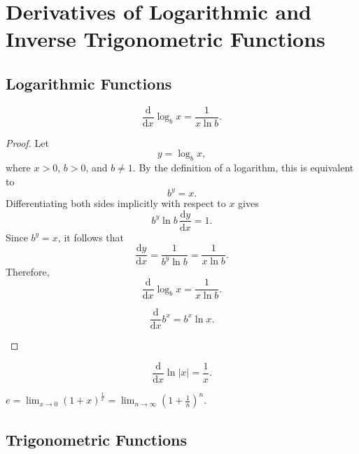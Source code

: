 \section{Derivatives of Logarithmic and Inverse Trigonometric Functions}
\subsection{Logarithmic Functions}
\begin{theorem}
    \[
        \frac{\mathrm{d}}{\mathrm{d}x} \log _b x = \frac{1}{x \ln b}. 
    \]
\end{theorem}
\begin{proof}
    Let
    \[
        y=\log_b x,
    \]
    where \(x>0\), \(b>0\), and \(b\neq1\).  By the definition of a
    logarithm, this is equivalent to
    \[
        b^y=x.
    \]
    Differentiating both sides implicitly with respect to \(x\) gives
    \[
        b^y\ln b\,\frac{\mathrm{d}y}{\mathrm{d}x}=1.
    \]
    Since \(b^y=x\), it follows that
    \[
        \frac{\mathrm{d}y}{\mathrm{d}x}
        =\frac{1}{b^y\ln b}
        =\frac{1}{x\ln b}.
    \]
    Therefore,
    \[
        \frac{\mathrm{d}}{\mathrm{d}x}\log_b x
        =\frac{1}{x\ln b}.
    \]
    \begin{remark}
        \[
            \frac{\mathrm{d}}{\mathrm{d}x} b^x = b^x \ln x . 
        \]
    \end{remark}
\end{proof}

\begin{theorem}
    \[
        \frac{\mathrm{d}}{\mathrm{d}x} \ln \vert x \vert = \frac{1}{x}.  
    \]
\end{theorem}

\begin{definition}
    \(e = \lim_{x \to 0} (1 + x)^{\frac{1}{x}} = \lim_{n \to \infty} \left( 1 + \frac{1}{n} \right)^n   \). 
\end{definition}

\subsection{Trigonometric Functions}

